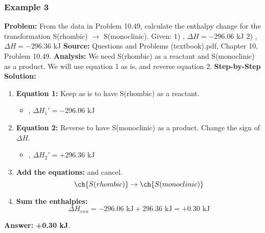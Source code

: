 \documentclass{article}
\begin{document}
\subsubsection{Example 3}
\textbf{Problem:} From the data in Problem 10.49, calculate the enthalpy change for the transformation S(rhombic) $\rightarrow$ S(monoclinic).
Given:
1) , $\Delta H = -296.06$ kJ
2) , $\Delta H = -296.36$ kJ
\textbf{Source:} Questions and Problems (textbook).pdf, Chapter 10, Problem 10.49.
\textbf{Analysis:} We need S(rhombic) as a reactant and S(monoclinic) as a product. We will use equation 1 as is, and reverse equation 2.
\textbf{Step-by-Step Solution:}
\begin{enumerate}
    \item \textbf{Equation 1:} Keep as is to have S(rhombic) as a reactant.
    \begin{itemize}
        \item {}, $\Delta H_1' = -296.06$ kJ
    \end{itemize}
    \item \textbf{Equation 2:} Reverse to have S(monoclinic) as a product. Change the sign of $\Delta H$.
    \begin{itemize}
        \item {}, $\Delta H_2' = +296.36$ kJ
    \end{itemize}
    \item \textbf{Add the equations:}  and  cancel.
    \[ \ch{S(rhombic)} \rightarrow \ch{S(monoclinic)} \]
    \item \textbf{Sum the enthalpies:}
    \[ \Delta H_{rxn} = -296.06 \text{ kJ} + 296.36 \text{ kJ} = +0.30 \text{ kJ} \]
\end{enumerate}
\textbf{Answer:} \textbf{+0.30 kJ}.
\end{document}
